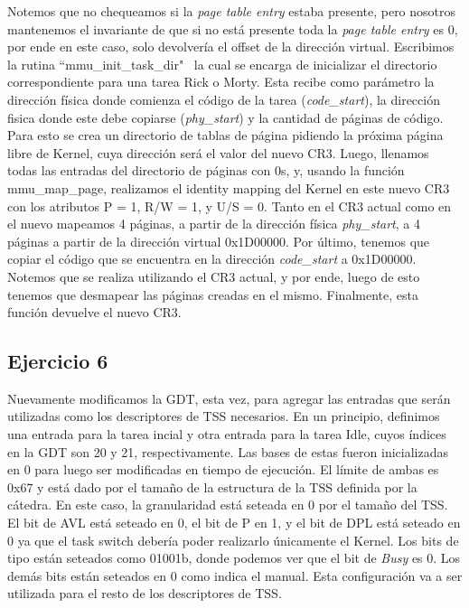 \documentclass[a4paper]{article}
\begin{document}
\justify
Notemos que no chequeamos si la \textit{page table entry} estaba presente, pero nosotros mantenemos el invariante de que si no está presente toda la \textit{page table entry} es 0, por ende en este caso, solo devolvería el offset de la dirección virtual.
\justify
Escribimos la rutina ``mmu_init_task_dir" \, la cual se encarga de inicializar el directorio correspondiente para una tarea Rick o Morty. Esta recibe como parámetro la dirección física donde comienza el código de la tarea (\textit{code_start}), la dirección fisica donde este debe copiarse (\textit{phy_start}) y la cantidad de páginas de código.
Para esto se crea un directorio de tablas de página pidiendo la próxima página libre de Kernel, cuya dirección será el valor del nuevo CR3. Luego, llenamos todas las entradas del directorio de páginas con 0s, y, usando la función mmu_map_page, realizamos el identity mapping del Kernel en este nuevo CR3 con los atributos P = 1, R/W = 1, y U/S = 0. Tanto en el CR3 actual como en el nuevo mapeamos 4 páginas, a partir de la dirección física \textit{phy_start}, a 4 páginas a partir de la dirección virtual 0x1D00000. Por último, tenemos que copiar el código que se encuentra en la dirección \textit{code_start} a 0x1D00000. Notemos que se realiza utilizando el CR3 actual, y por ende, luego de esto tenemos que desmapear las páginas creadas en el mismo. Finalmente, esta función devuelve el nuevo CR3.
 

\subsection{Ejercicio 6}

\justify
Nuevamente modificamos la GDT, esta vez, para agregar las entradas que serán utilizadas como los descriptores de TSS necesarios. En un principio, definimos una entrada para la tarea incial y otra entrada para la tarea Idle, cuyos índices en la GDT son 20 y 21, respectivamente. Las bases de estas fueron inicializadas en 0 para luego ser modificadas en tiempo de ejecución. El límite de ambas es 0x67 y está dado por el tamaño de la estructura de la TSS definida por la cátedra. En este caso, la granularidad está seteada en 0 por el tamaño del TSS. El bit de AVL está seteado en 0, el bit de P en 1, y el bit de DPL está seteado en 0 ya que el task switch debería poder realizarlo únicamente el Kernel. Los bits de tipo están seteados como 01001b, donde podemos ver que el bit de \textit{Busy} es 0. Los demás bits están seteados en 0 como indica el manual. Esta configuración va a ser utilizada para el resto de los descriptores de TSS.
\end{document}
